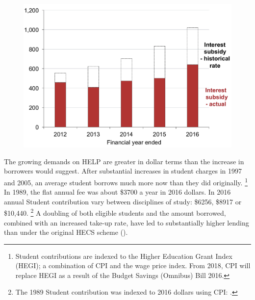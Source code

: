 \documentclass[embargoed]{grattan}
\begin{document}
\begin{figure}
\begin{minipage}[t][\textheight]{\columnwidth}
\includegraphics[page=5]{atlas/Chartpack.pdf}

%
{\textcites{EducationvariousyearsSelectedhighereducation}{EducationvariousyearsHighereducationreport}}

\end{minipage}
\end{figure}



The growing demands on \gls{HELP} are greater in dollar terms than the increase in borrowers would suggest.
After substantial increases in student charges in 1997 and 2005, an average student borrows much more now than they did originally.%
\footnote{Student contributions are indexed to the Higher Education Grant Index (HEGI); a combination of \gls{CPI} and the wage price index.
From 2018, \gls{CPI} will replace HEGI as a result of the Budget Savings (Omnibus) Bill 2016.} In 1989, the flat annual fee was about \$3700 a year in 2016 dollars.
In 2016 annual \gls{Student contribution} vary between disciplines of study: \$6256, \$8917 or \$10,440.%
\footnote{The 1989 \gls{Student contribution} was indexed to 2016 dollars using \gls{CPI}: \textcites{DET2015FundingClusters}{ABS2016ConsumerPriceIndex}.} 
A doubling of both eligible students and the amount borrowed, combined with an increased take-up rate, have led to substantially higher lending than under the original \gls{HECS} scheme ().
\end{document}
